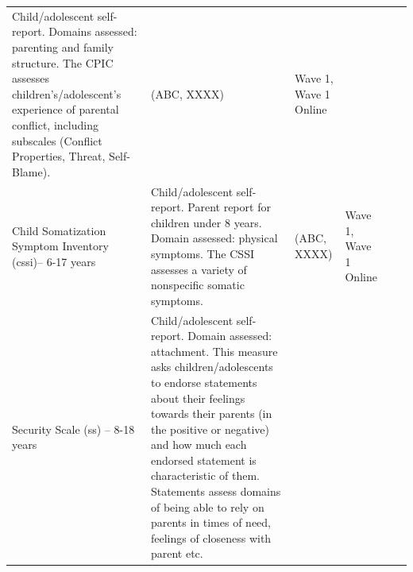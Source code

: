 \documentclass[]{book}
\begin{document}
\begin{longtable}[]{@{}llllll@{}}
\begin{minipage}[t]{0.18\columnwidth}
Child/adolescent self-report. Domains assessed: parenting and family structure. The CPIC assesses children's/adolescent's experience of parental conflict, including subscales (Conflict Properties, Threat, Self-Blame).\strut
\end{minipage} & \begin{minipage}[t]{0.15\columnwidth}\raggedright
(ABC, XXXX)\strut
\end{minipage} & \begin{minipage}[t]{0.16\columnwidth}\raggedright
Wave 1, Wave 1 Online\strut
\end{minipage} & \begin{minipage}[t]{0.06\columnwidth}\raggedright
\strut
\end{minipage} & \begin{minipage}[t]{0.10\columnwidth}\raggedright
\strut
\end{minipage}\tabularnewline
\begin{minipage}[t]{0.18\columnwidth}\raggedright
Child Somatization Symptom Inventory (cssi)-- 6-17 years\strut
\end{minipage} & \begin{minipage}[t]{0.18\columnwidth}\raggedright
Child/adolescent self-report. Parent report for children under 8 years. Domain assessed: physical symptoms. The CSSI assesses a variety of nonspecific somatic symptoms.\strut
\end{minipage} & \begin{minipage}[t]{0.15\columnwidth}\raggedright
(ABC, XXXX)\strut
\end{minipage} & \begin{minipage}[t]{0.16\columnwidth}\raggedright
Wave 1, Wave 1 Online\strut
\end{minipage} & \begin{minipage}[t]{0.06\columnwidth}\raggedright
\strut
\end{minipage} & \begin{minipage}[t]{0.10\columnwidth}\raggedright
\strut
\end{minipage}\tabularnewline
\begin{minipage}[t]{0.18\columnwidth}\raggedright
Security Scale (ss) -- 8-18 years\strut
\end{minipage} & \begin{minipage}[t]{0.18\columnwidth}\raggedright
Child/adolescent self-report. Domain assessed: attachment. This measure asks children/adolescents to endorse statements about their feelings towards their parents (in the positive or negative) and how much each endorsed statement is characteristic of them. Statements assess domains of being able to rely on parents in times of need, feelings of closeness with parent etc.\strut

\end{minipage}
\end{longtable}
\end{document}
